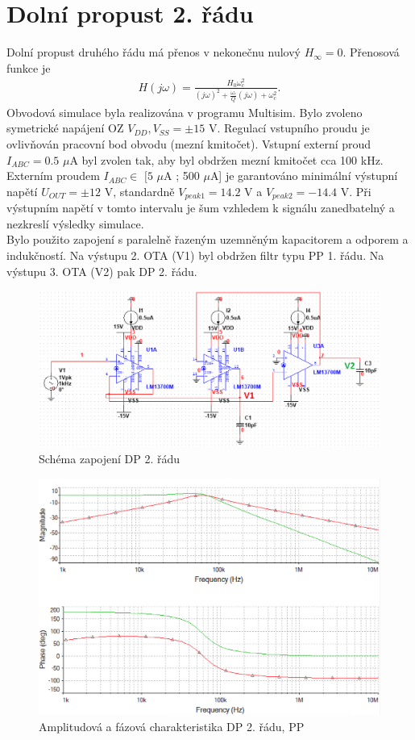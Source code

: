 \documentclass[twoside]{article}
\begin{document}
\section{Dolní propust 2. řádu}\label{s:DP2}
Dolní propust druhého řádu má přenos v nekonečnu nulový $H_{\infty} = 0$. Přenosová funkce je
\begin{align}
H(j\omega) = \frac{H_0 \omega_c ^2}{(j\omega)^2 + \frac{\omega _c}{Q}(j\omega) + \omega _c ^2}.
\end{align}
\noindent Obvodová simulace byla realizována v programu Multisim. Bylo zvoleno symetrické napájení OZ $V_{DD},V_{SS} = \pm 15$ V. Regulací vstupního proudu je ovlivňován pracovní bod obvodu (mezní kmitočet). Vstupní externí proud $I_{ABC} = 0.5$ $\mu$A byl zvolen tak, aby byl obdržen mezní kmitočet cca 100 kHz. Externím proudem $I_{ABC} \in$ $[5$ $\mu$A ; 500 $\mu$A] je garantováno minimální výstupní napětí $U_{OUT} = \pm 12$ V, standardně $V_{peak 1} = 14.2$ V a $V_{peak 2} = -14.4$ V. Při výstupním napětí v tomto intervalu je šum vzhledem k signálu zanedbatelný a nezkreslí výsledky simulace.\\
\noindent Bylo použito zapojení s paralelně řazeným uzemněným kapacitorem a odporem a indukčností. Na výstupu 2. OTA (V1) byl obdržen filtr typu PP 1. řádu. Na výstupu 3. OTA (V2) pak DP 2. řádu.
\begin{figure}[H]
\centering
\includegraphics[scale=0.3]{bplp.png}
\caption{Schéma zapojení DP 2. řádu}
\end{figure}\begin{figure}[H]
\centering
\includegraphics[scale=0.5]{bplp2.png}
\caption{Amplitudová a fázová charakteristika DP 2. řádu, PP}
\end{figure}
\end{document}
